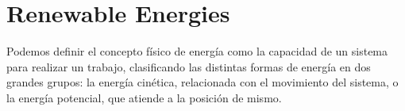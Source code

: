 





\section{Renewable Energies}

Podemos definir el concepto físico de energía como la capacidad de un sistema para realizar un trabajo, clasificando las distintas formas de energía en dos grandes grupos: la energía cinética, relacionada con el movimiento del sistema, o la energía potencial, que atiende a la posición de mismo.\\

